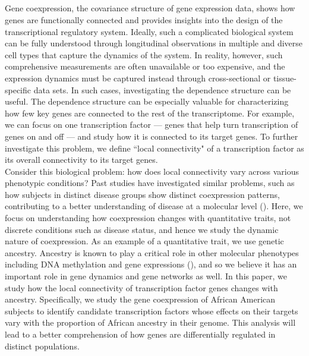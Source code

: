 \documentclass[aoas,authoryear, preprint]{imsart}
\numberwithin{equation}{section}
\theoremstyle{plain}
\begin{document}
\subsection*{}
Gene coexpression, the covariance structure of gene expression data, shows how genes are functionally connected and provides insights into the design of the transcriptional regulatory system. Ideally, such a complicated biological system can be fully understood through longitudinal observations in multiple and diverse cell types that capture the dynamics of the system. In reality, however, such comprehensive measurements are often unavailable or too expensive, and the expression dynamics must be captured instead through cross-sectional or tissue-specific data sets. In such cases, investigating the dependence structure can be useful. The dependence structure can be especially valuable for characterizing how few key genes are connected to the rest of the transcriptome. For example, we can focus on one transcription factor --- genes that help turn transcription of genes on and off --- and study how it is connected to its target genes. To further investigate this problem, we define ``local connectivity" of a transcription factor as its overall connectivity to its target genes.\\

Consider this biological problem: how does local connectivity vary across various phenotypic conditions?  Past studies have investigated similar problems, such as how subjects in distinct disease groups show distinct coexpression patterns, contributing to a better understanding of disease at a molecular level (\cite{de2010differential}). Here, we focus on understanding how coexpression changes with quantitative traits, not discrete conditions such as disease status, and hence we study the dynamic nature of coexpression. As an example of a quantitative trait, we use genetic ancestry. Ancestry is known to play a critical role in other molecular phenotypes including DNA methylation and gene expressions (\cite{galanter2017differential, price2008effects}), and so we believe it has an important role in gene dynamics and gene networks as well. In this paper, we study how the local connectivity of transcription factor genes changes with ancestry. Specifically, we study the gene coexpression of African American subjects to identify candidate transcription factors whose effects on their targets vary with the proportion of African ancestry in their genome. This analysis will lead to a better comprehension of how genes are differentially regulated in distinct populations. \\
\end{document}
